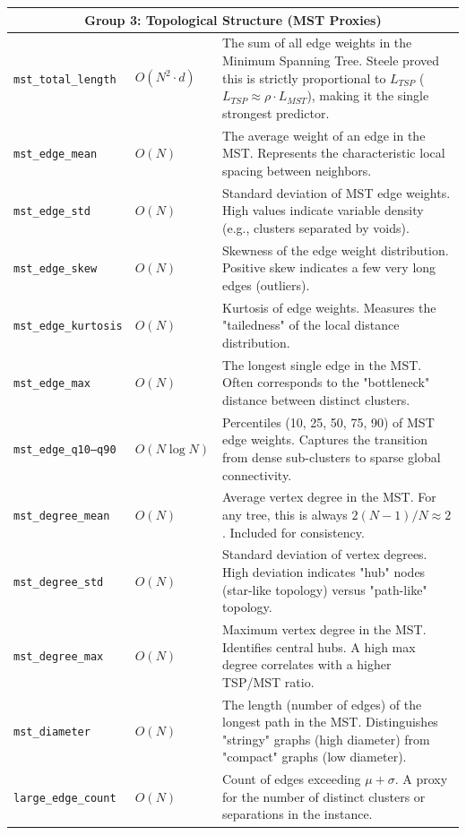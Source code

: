 \documentclass{article}
\begin{document}
\begin{longtable}{p{4cm} p{2.5cm} p{8.5cm}}
\multicolumn{3}{c}{\textbf{Group 3: Topological Structure (MST Proxies)}} \\
\midrule
\texttt{mst\_total\_length} & $O(N^2 \cdot d)$ & The sum of all edge weights in the Minimum Spanning Tree. Steele proved this is strictly proportional to $L_{TSP}$ ($L_{TSP} \approx \rho \cdot L_{MST}$), making it the single strongest predictor. \\
\texttt{mst\_edge\_mean} & $O(N)$ & The average weight of an edge in the MST. Represents the characteristic local spacing between neighbors. \\
\texttt{mst\_edge\_std} & $O(N)$ & Standard deviation of MST edge weights. High values indicate variable density (e.g., clusters separated by voids). \\
\texttt{mst\_edge\_skew} & $O(N)$ & Skewness of the edge weight distribution. Positive skew indicates a few very long edges (outliers). \\
\texttt{mst\_edge\_kurtosis} & $O(N)$ & Kurtosis of edge weights. Measures the "tailedness" of the local distance distribution. \\
\texttt{mst\_edge\_max} & $O(N)$ & The longest single edge in the MST. Often corresponds to the "bottleneck" distance between distinct clusters. \\
\texttt{mst\_edge\_q10--q90} & $O(N \log N)$ & Percentiles (10, 25, 50, 75, 90) of MST edge weights. Captures the transition from dense sub-clusters to sparse global connectivity. \\
\texttt{mst\_degree\_mean} & $O(N)$ & Average vertex degree in the MST. For any tree, this is always $2(N-1)/N \approx 2$. Included for consistency. \\
\texttt{mst\_degree\_std} & $O(N)$ & Standard deviation of vertex degrees. High deviation indicates "hub" nodes (star-like topology) versus "path-like" topology. \\
\texttt{mst\_degree\_max} & $O(N)$ & Maximum vertex degree in the MST. Identifies central hubs. A high max degree correlates with a higher TSP/MST ratio. \\
\texttt{mst\_diameter} & $O(N)$ & The length (number of edges) of the longest path in the MST. Distinguishes "stringy" graphs (high diameter) from "compact" graphs (low diameter). \\
\texttt{large\_edge\_count} & $O(N)$ & Count of edges exceeding $\mu + \sigma$. A proxy for the number of distinct clusters or separations in the instance. \\
\bottomrule
\end{longtable}
\end{document}
